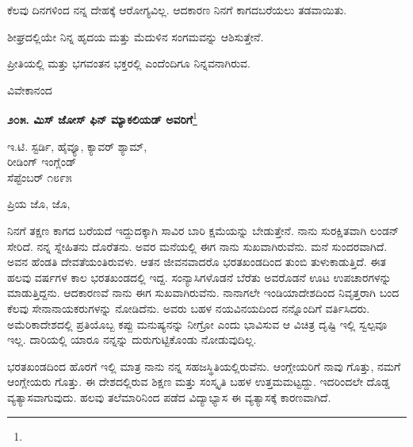 \vspace{0.1cm}

ಕೆಲವು ದಿನಗಳಿಂದ ನನ್ನ ದೇಹಕ್ಕೆ ಆರೋಗ್ಯವಿಲ್ಲ. ಆದಕಾರಣ ನಿನಗೆ ಕಾಗದ\break ಬರೆಯಲು ತಡವಾಯಿತು.

\vspace{0.1cm}

ಶೀಘ್ರದಲ್ಲಿಯೇ ನಿನ್ನ ಹೃದಯ ಮತ್ತು ಮೆದುಳಿನ ಸಂಗಮವನ್ನು ಆಶಿಸುತ್ತೇನೆ.

\vspace{0.1cm}

ಪ್ರೀತಿಯಲ್ಲಿ ಮತ್ತು ಭಗವಂತನ ಭಕ್ತರಲ್ಲಿ ಎಂದೆಂದಿಗೂ ನಿನ್ನವನಾಗಿರುವ.

\vspace{0.1cm}

{\flushright
ವಿವೇಕಾನಂದ\par}

\begin{center}
\textbf{೨೦೫. ಮಿಸ್ ಜೋಸ್ ಫಿನ್ ಮ್ಯಾಕಲಿಯಡ್ ಅವರಿಗೆ}\footnote{}
\end{center}

\vspace{0.1cm}

\begin{flushright}
ಇ.ಟಿ. ಸ್ಟರ್ಡಿ, ಹೈವ್ಯೂ, ಕ್ಯಾವರ್ ಶ್ಯಾಮ್,\\ರೀಡಿಂಗ್ ಇಂಗ್ಲೆಂಡ್\\ಸೆಪ್ಟೆಂಬರ್ ೧೮೯೫
\end{flushright}

\noindent
ಪ್ರಿಯ ಜೊ, ಜೊ,

\vspace{0.1cm}

ನಿನಗೆ ತಕ್ಷಣ ಕಾಗದ ಬರೆಯದೆ ಇದ್ದುದಕ್ಕಾಗಿ ಸಾವಿರ ಬಾರಿ ಕ್ಷಮೆಯನ್ನು ಬೇಡುತ್ತೇನೆ. ನಾನು ಸುರಕ್ಷಿತವಾಗಿ ಲಂಡನ್ ಸೇರಿದೆ. ನನ್ನ ಸ್ನೇಹಿತನು ದೊರೆತನು. ಅವರ ಮನೆಯಲ್ಲಿ ಈಗ ನಾನು ಸುಖವಾಗಿರುವೆನು. ಮನೆ ಸುಂದರವಾಗಿದೆ. ಅವನ ಹೆಂಡತಿ ದೇವತೆಯಂತಿರುವಳು. ಆತನ ಜೀವನವಾದರೊ ಭರತಖಂಡದಿಂದ ತುಂಬಿ ತುಳುಕಾಡುತ್ತಿದೆ. ಈತ ಹಲವು ವರ್ಷಗಳ ಕಾಲ ಭರತಖಂಡದಲ್ಲಿ ಇದ್ದ. ಸಂನ್ಯಾಸಿಗಳೊಡನೆ ಬೆರೆತು ಅವರೊಡನೆ ಊಟ ಉಪಚಾರಗಳನ್ನು ಮಾಡುತ್ತಿದ್ದನು. ಆದಕಾರಣವೆ ನಾನು ಈಗ ಸುಖವಾಗಿರುವೆನು. ನಾನಾಗಲೇ ಇಂಡಿಯಾದೇಶದಿಂದ ನಿವೃತ್ತರಾಗಿ ಬಂದ ಕೆಲವು ಸೇನಾನಾಯಕರುಗಳನ್ನು ನೋಡಿದೆನು. ಅವರು ಬಹಳ ನಯವಿನಯದಿಂದ ನನ್ನೊಂದಿಗೆ ವರ್ತಿಸಿದರು. ಅಮೆರಿಕಾದೇಶದಲ್ಲಿ ಪ್ರತಿಯೊಬ್ಬ ಕಪ್ಪು ಮನುಷ್ಯನನ್ನು ನೀಗ್ರೋ ಎಂದು ಭಾವಿಸುವ ಆ ವಿಚಿತ್ರ ದೃಷ್ಟಿ ಇಲ್ಲಿ ಸ್ವಲ್ಪವೂ ಇಲ್ಲ. ದಾರಿಯಲ್ಲಿ ಯಾರೂ ನನ್ನನ್ನು ದುರುಗುಟ್ಟಿಕೊಂಡು ನೋಡುವುದಿಲ್ಲ.

\vspace{0.1cm}

ಭರತಖಂಡದಿಂದ ಹೊರಗೆ ಇಲ್ಲಿ ಮಾತ್ರ ನಾನು ನನ್ನ ಸಹಜಸ್ಥಿತಿಯಲ್ಲಿರುವೆನು. ಆಂಗ್ಲೇಯರಿಗೆ ನಾವು ಗೊತ್ತು, ನಮಗೆ ಆಂಗ್ಲೇಯರು ಗೊತ್ತು. ಈ ದೇಶದಲ್ಲಿರುವ ಶಿಕ್ಷಣ ಮತ್ತು ಸಂಸ್ಕೃತಿ ಬಹಳ ಉತ್ತಮಮಟ್ಟದ್ದು. ಇದರಿಂದಲೇ ದೊಡ್ಡ ವ್ಯತ್ಯಾಸವಾಗುವುದು. ಹಲವು ತಲೆಮಾರಿನಿಂದ ಪಡೆದ ವಿದ್ಯಾಭ್ಯಾಸ ಈ ವ್ಯತ್ಯಾಸಕ್ಕೆ ಕಾರಣವಾಗಿದೆ.

